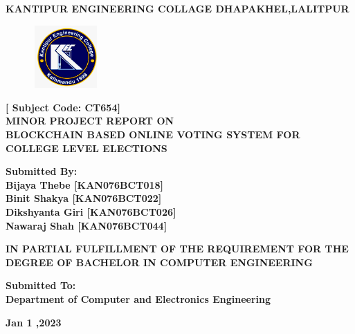 \documentclass[a4paper,12pt]{report}
\begin{document}

\begin{titlepage}
   \begin{center}
       \vspace*{1cm}

       \textbf{\large {\bf KANTIPUR ENGINEERING COLLAGE
                       DHAPAKHEL,LALITPUR} }
                       
        \begin{figure}[htb!]
              \centering
              \includegraphics[width=2.5cm, height=2.4cm]{images/ClzLogo.png} 
        \end{figure}
        
        \hspace{0.5cm}
       \textbf{\small{ [ Subject Code: CT654] }}\\
     {\bf MINOR PROJECT REPORT ON \\ BLOCKCHAIN BASED ONLINE VOTING SYSTEM FOR COLLEGE LEVEL ELECTIONS }
     
       \vspace{2.3cm}
    \textbf{\small
                Submitted By:\\
                Bijaya Thebe   [KAN076BCT018] \\
                Binit Shakya    [KAN076BCT022] \\
                Dikshyanta Giri [KAN076BCT026] \\
                Nawaraj Shah [KAN076BCT044] \\
                }


        \vspace{2cm}
         \textbf{\small{IN PARTIAL FULFILLMENT OF THE REQUIREMENT 
         FOR THE DEGREE OF  BACHELOR IN COMPUTER ENGINEERING}}
            
            
       \vspace{1.5cm}


       \vfill
            
       \vspace{0.8cm}
            
       \textbf{\small
           Submitted To:\\
           Department of Computer and Electronics Engineering
           }
           
           \vfill
       \vspace{0.5cm}
         \textbf{\small  Jan 1 ,2023}
            
   \end{center}
\end{titlepage}
\end{document}
